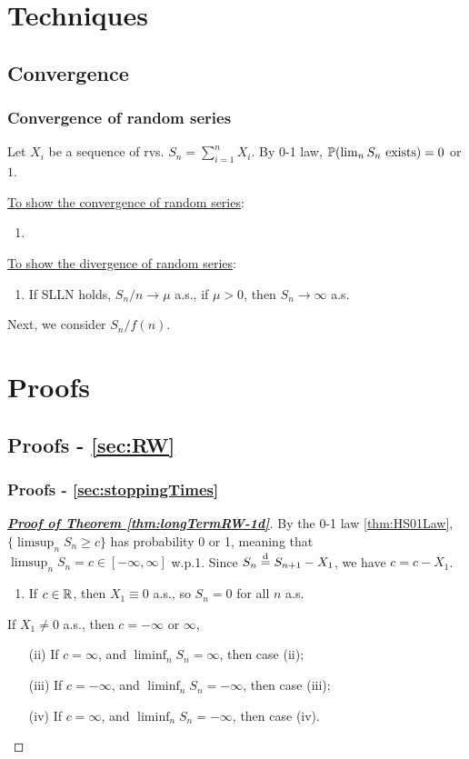\documentclass[10pt,a4paper]{article}
\begin{document}
\section{Techniques}\label{sec:techniques}
\subsection{Convergence}\label{sec:tech-cvg}
\subsubsection{Convergence of random series}\label{sec:tech-cvg-rseries}
Let $X_i$ be a sequence of rvs. $S_n=\sum_{i=1}^{n}X_i$. By 0-1 law, $\mathbb P(\lim_{n}S_n \text{ exists})=0$ or $1$.   

\underline{To show the convergence of random series}:
\begin{enumerate}
	\item 
\end{enumerate}

\underline{To show the divergence of random series}:
\begin{enumerate}
	\item If SLLN holds, $S_n/n \to \mu$ a.s., if $\mu>0$, then $S_n\to \infty$ a.s.
\end{enumerate}

Next, we consider $S_n/f(n)$. 


\appendix
\section{Proofs}\label{sec:proof}
\subsection{Proofs - \ref{sec:RW}}\label{sec:proof-RW}
\subsubsection{Proofs - \ref{sec:stoppingTimes}}\label{sec:proof-stoppingTimes}
\begin{proof}[\underline{\textbf{Proof of Theorem \ref{thm:longTermRW-1d}}}]
	By the 0-1 law \ref{thm:HS01Law}, $\{\limsup_n S_n\geq c\}$ has probability 0 or 1, meaning that $\limsup_n S_n=c\in [-\infty ,\infty ]$ w.p.1. Since $S_n \stackrel{\mathrm{d}}{=} S_{n+1}-X_{1}$, we have $c=c-X_1$.
\begin{enumerate}[label=(\roman*)]
	\item If $c\in\mathbb R$, then $X_1\equiv 0$ a.s., so $S_n=0$ for all $n$ a.s.
\end{enumerate}
If $X_1\neq 0$ a.s., then $c=-\infty $ or $\infty $,   
\begin{enumerate}
	\item[(ii)] If $c=\infty $, and $\liminf_n S_n=\infty $, then case (ii);
	\item[(iii)] If $c=-\infty $, and $\liminf_n S_n=-\infty $, then case (iii);
	\item[(iv)] If $c=\infty $, and $\liminf_n S_n=-\infty $, then case (iv).       
\end{enumerate}
\end{proof}
\end{document}
